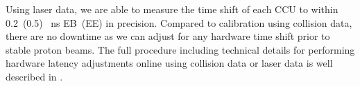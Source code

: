 Using laser data, we are able to measure the time shift of each CCU to within 0.2~(0.5)~ ns EB~(EE) in precision. Compared to calibration using collision data, there are no downtime as we can adjust for any hardware time shift prior to stable proton beams.
The full procedure including technical details for performing hardware latency adjustments online using collision data or laser data is well described in \cite{ECALHW}.
